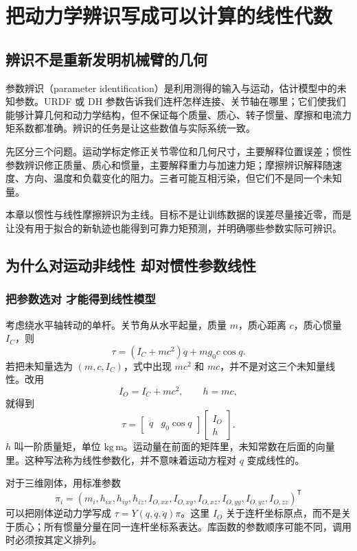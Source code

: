 \chapter{把动力学辨识写成可以计算的线性代数}\label{ch:identification}
\section{辨识不是重新发明机械臂的几何}
参数辨识（parameter identification）是利用测得的输入与运动，估计模型中的未知参数。URDF 或 DH 参数告诉我们连杆怎样连接、关节轴在哪里；它们使我们能够计算几何和动力学结构，但不保证每个质量、质心、转子惯量、摩擦和电流力矩系数都准确。辨识的任务是让这些数值与实际系统一致。

先区分三个问题。运动学标定修正关节零位和几何尺寸，主要解释位置误差；惯性参数辨识修正质量、质心和惯量，主要解释重力与加速力矩；摩擦辨识解释随速度、方向、温度和负载变化的阻力。三者可能互相污染，但它们不是同一个未知量。

本章以惯性与线性摩擦辨识为主线。目标不是让训练数据的误差尽量接近零，而是让没有用于拟合的新轨迹也能得到可靠力矩预测，并明确哪些参数实际可辨识。

\section{为什么对运动非线性 却对惯性参数线性}
\subsection{把参数选对 才能得到线性模型}
考虑绕水平轴转动的单杆。关节角从水平起量，质量 $m$，质心距离 $c$，质心惯量 $I_C$，则
\[
 \tau=(I_C+mc^2)\ddot q+mg_0c\cos q.
\]
若把未知量选为 $(m,c,I_C)$，式中出现 $mc^2$ 和 $mc$，并不是对这三个未知量线性。改用
\[
 I_O=I_C+mc^2,\qquad h=mc,
\]
就得到
\begin{equation}
 \tau=\begin{bmatrix}\ddot q&g_0\cos q\end{bmatrix}
 \begin{bmatrix}I_O\\h\end{bmatrix}.
\end{equation}
$h$ 叫一阶质量矩，单位 $\mathrm{kg\,m}$。运动量在前面的矩阵里，未知常数在后面的向量里。这种写法称为线性参数化，并不意味着运动方程对 $q$ 变成线性的。

对于三维刚体，用标准参数
\begin{equation}
 \pi_i=(m_i,h_{ix},h_{iy},h_{iz},I_{O,xx},I_{O,xy},I_{O,xz},I_{O,yy},I_{O,yz},I_{O,zz})^{\mathsf T}
\end{equation}
可以把刚体逆动力学写成 $\tau=Y(q,\dot q,\ddot q)\pi$。这里 $I_O$ 关于连杆坐标原点，而不是关于质心；所有惯量分量在同一连杆坐标系表达。库函数的参数顺序可能不同，调用时必须按其定义排列。

